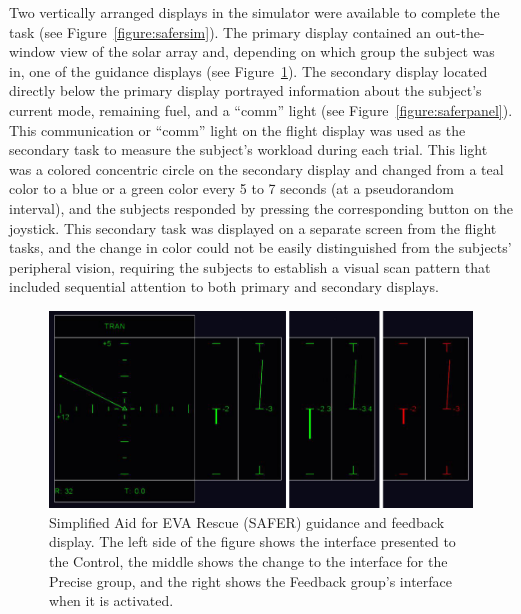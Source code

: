 Two vertically arranged displays in the simulator were available to complete the task (see Figure~\ref{figure:safersim}).
The primary display contained an out-the-window view of the solar array and, depending on which group the subject was in, one of the guidance displays (see Figure~\ref{figure:safergroups}).
The secondary display located directly below the primary display portrayed information about the subject's current mode, remaining fuel, and a ``comm'' light (see Figure~\ref{figure:saferpanel}).
This communication or ``comm'' light on the flight display was used as the secondary task to measure the subject's workload during each trial.
This light was a colored concentric circle on the secondary display and changed from a teal color to a blue or a green color every 5 to 7 seconds (at a pseudorandom interval), and the subjects responded by pressing the corresponding button on the joystick.
This secondary task was displayed on a separate screen from the flight tasks, and the change in color could not be easily distinguished from the subjects' peripheral vision, requiring the subjects to establish a visual scan pattern that included sequential attention to both primary and secondary displays.

\begin{figure}[tb!]
    \begin{center}
        \includegraphics[width=\linewidth]{figures/Introduction/SAFERGroups.png}
        \caption[Simplified Aid for EVA Rescue (SAFER) guidance and feedback display]{Simplified Aid for EVA Rescue (SAFER) guidance and feedback display. The left side of the figure shows the interface presented to the Control, the middle shows the change to the interface for the Precise group, and the right shows the Feedback group's interface when it is activated.}
        \label{figure:safergroups}
    \end{center}
\end{figure}

